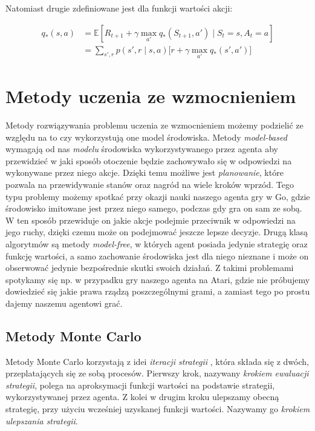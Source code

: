 \documentclass[licencjacka]{pracamgr}
\begin{document}
Natomiast drugie zdefiniowane jest dla funkcji wartości akcji:

\begin{align}
q_{\ast}(s, a) &= \mathbb{E}[R_{t+1} + \gamma \max_{a'} q_{\ast} (S_{t+1}, a') \mid S_t = s, A_t = a] \nonumber \\
&= \sum_{s', r} p(s', r \mid s, a) \Big[r + \gamma \max_{a'} q_{\ast} (s', a') \Big]
\end{align}

\section{Metody uczenia ze wzmocnieniem}

Metody rozwiązywania problemu uczenia ze wzmocnieniem możemy podzielić ze względu na to czy wykorzystują one model środowiska. Metody \emph{model-based} wymagają od nas \emph{modelu} środowiska wykorzystywanego przez agenta aby przewidzieć w jaki sposób otoczenie będzie zachowywało się w odpowiedzi na wykonywane przez niego akcje.
Dzięki temu możliwe jest \emph{planowanie}, które pozwala na przewidywanie stanów oraz nagród na wiele kroków wprzód. Tego typu problemy możemy spotkać przy okazji nauki naszego agenta gry w Go\cite{alphago2016, alphagozero}, gdzie środowisko imitowane jest przez niego samego, podczas gdy gra on sam ze sobą. W ten sposób przewiduje on jakie akcje podejmie przeciwnik w odpowiedzi na jego ruchy, dzięki czemu może on podejmować jeszcze lepsze decyzje.
Drugą klasą algorytmów są metody \emph{model-free}, w których agent posiada jedynie strategię oraz funkcję wartości, a samo zachowanie środowiska jest dla niego nieznane i może on obserwować jedynie bezpośrednie skutki swoich działań. Z takimi problemami spotykamy się np. w przypadku gry naszego agenta na Atari, gdzie nie próbujemy dowiedzieć się jakie prawa rządzą poszczególnymi grami, a zamiast tego po prostu dajemy naszemu agentowi grać.

\subsection{Metody Monte Carlo}

Metody Monte Carlo korzystają z idei \emph{iteracji strategii} \cite{policy-iteration}, która składa się z dwóch, przeplatających się ze sobą procesów. Pierwszy krok, nazywany \emph{krokiem ewaluacji strategii}, polega na aproksymacji funkcji wartości na podstawie strategii, wykorzystywanej przez agenta. Z kolei w drugim kroku ulepszamy obecną strategię, przy użyciu wcześniej uzyskanej funkcji wartości. Nazywamy go \emph{krokiem ulepszania strategii}.
\end{document}

